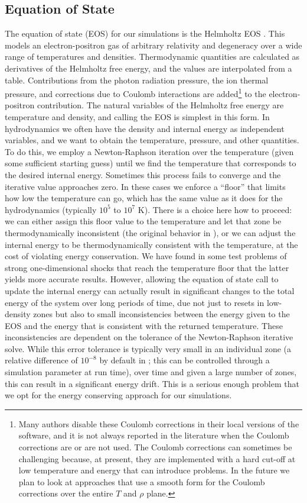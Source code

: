 \documentclass[12pt]{article}
\begin{document}
\subsection{Equation of State}
\label{sec:eos}

The equation of state (EOS) for our simulations is the Helmholtz EOS
\citep{timmes-swesty:2000}. This models an electron-positron gas of
arbitrary relativity and degeneracy over a wide range of temperatures
and densities. Thermodynamic quantities are calculated as derivatives
of the Helmholtz free energy, and the values are interpolated from a
table. Contributions from the photon radiation pressure, the ion thermal
pressure, and corrections due to Coulomb interactions are
added\footnote{Many authors disable these Coulomb corrections in
their local versions of the software, and it is not always reported
in the literature when the Coulomb corrections are or are not used. The
Coulomb corrections can sometimes be challenging because, at present, they
are implemented with a hard cut-off at low temperature and energy that
can introduce problems. In the future we plan to look at approaches that
use a smooth form for the Coulomb corrections over the entire $T$ and $\rho$
plane.} to the electron-positron contribution.
The natural variables of the Helmholtz free energy are
temperature and density, and calling the EOS is simplest in this
form. In hydrodynamics we often have the density and
internal energy as independent variables, and we want to obtain the
temperature, pressure, and other quantities. To do this, we employ a
Newton-Raphson iteration over the temperature (given some sufficient
starting guess) until we find the temperature that corresponds to the
desired internal energy. Sometimes this process fails to converge and
the iterative value approaches zero. In these cases we enforce a
``floor'' that limits how low the temperature can go, which has the same
value as it does for the hydrodynamics (typically $10^5$ to $10^7$ K).
There is a choice here how to proceed: we can either
assign this floor value to the temperature and let that zone be
thermodynamically inconsistent (the original behavior in \castro), or
we can adjust the internal energy to be thermodynamically consistent
with the temperature, at the cost of violating energy conservation. We
have found in some test problems of strong one-dimensional shocks \citep{zingalekatz:2015}
that reach the temperature floor that the latter yields more accurate results.
However, allowing the equation of state call to update the
internal energy can actually result in significant changes to the
total energy of the system over long periods of time,
due not just to resets in low-density zones but also to small
inconsistencies between the energy given to the EOS and the energy
that is consistent with the returned temperature. These inconsistencies
are dependent on the tolerance of the Newton-Raphson iterative solve.
While this error tolerance is typically very small in an individual zone (a relative
difference of $10^{-8}$ by default in \castro; this can be controlled through a
simulation parameter at run time), over time and given
a large number of zones, this can result in a significant energy
drift. This is a serious enough problem that we opt for the energy
conserving approach for our simulations.
\end{document}
